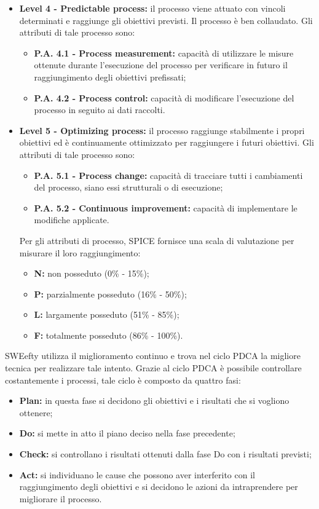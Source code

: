 \begin{itemize}
\begin{itemize}
		\end{itemize}
	\item \textbf{Level 4 - Predictable process:}
		il processo viene attuato con vincoli determinati  e  raggiunge  gli  obiettivi  previsti. Il processo è ben collaudato. Gli attributi di tale processo sono:
		\begin{itemize}
			\item \textbf{P.A. 4.1 - Process measurement:}
			capacità  di  utilizzare  le  misure ottenute durante l’esecuzione del processo per verificare in futuro il raggiungimento degli obiettivi prefissati;
			\item \textbf{P.A. 4.2 - Process control:}
			capacità  di  modificare  l’esecuzione  del processo in seguito ai dati raccolti.
		\end{itemize}
	\item \textbf{Level 5 - Optimizing process:}
		il processo raggiunge stabilmente i propri obiettivi ed è continuamente ottimizzato per raggiungere i futuri obiettivi.
		Gli attributi di tale processo sono:
		\begin{itemize}
			\item \textbf{P.A. 5.1 - Process change:}
			capacità di tracciare tutti i cambiamenti del processo, siano essi strutturali o di esecuzione;
			\item \textbf{P.A. 5.2 - Continuous improvement:}
			capacità di implementare le modifiche applicate.
		\end{itemize}

		Per gli attributi di processo, SPICE fornisce una scala di valutazione per misurare il loro raggiungimento:
		\begin{itemize}
			\item \textbf{N:} non posseduto (0\% - 15\%);
			\item \textbf{P:} parzialmente posseduto (16\% - 50\%);
			\item \textbf{L:} largamente posseduto (51\% - 85\%);
			\item \textbf{F:} totalmente posseduto (86\% - 100\%).
		\end{itemize}
\end{itemize}
	SWEefty utilizza il miglioramento continuo e trova nel ciclo PDCA la migliore tecnica per realizzare tale intento.
	Grazie al ciclo PDCA è possibile controllare costantemente i processi, tale ciclo è composto da quattro fasi:
	\begin{itemize}
		\item \textbf{Plan:} in questa fase si decidono gli obiettivi e i risultati che si vogliono ottenere;
		\item \textbf{Do:} si mette in atto il piano deciso nella fase precedente;	
		\item \textbf{Check:} si controllano i risultati ottenuti dalla fase Do con i risultati previsti;
		\item \textbf{Act:} si individuano le cause che possono aver interferito con il raggiungimento degli obiettivi e si decidono le azioni da intraprendere per migliorare il processo.
	\end{itemize}

